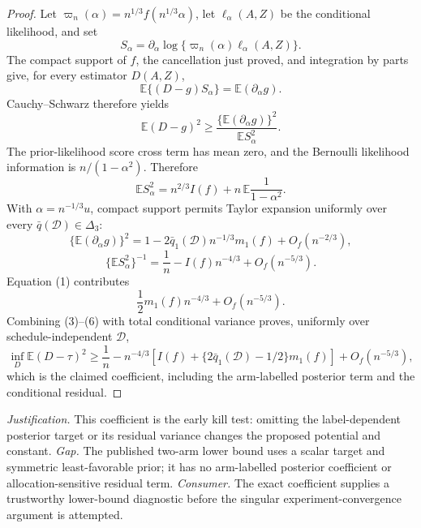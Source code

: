 \documentclass{article}
\begin{document}
\begin{proof}
Let \(\varpi_n(\alpha)=n^{1/3}f(n^{1/3}\alpha)\), let \(\ell_\alpha(A,Z)\) be the conditional likelihood, and set
\[
S_\alpha=\partial_\alpha\log\{\varpi_n(\alpha)\ell_\alpha(A,Z)\}.
\]
The compact support of \(f\), the cancellation just proved, and integration by parts give, for every estimator \(D(A,Z)\),
\[
\mathbb E\{(D-g)S_\alpha\}=\mathbb E(\partial_\alpha g).
\]
Cauchy--Schwarz therefore yields
\[
\mathbb E(D-g)^2\geq
\frac{\{\mathbb E(\partial_\alpha g)\}^2}{\mathbb E S_\alpha^2}.
\tag{3}
\]
The prior-likelihood score cross term has mean zero, and the Bernoulli likelihood information is \(n/(1-\alpha^2)\).  Therefore
\[
\mathbb E S_\alpha^2
=n^{2/3}I(f)+n\,\mathbb E\frac1{1-\alpha^2}.
\tag{4}
\]
With \(\alpha=n^{-1/3}u\), compact support permits Taylor expansion uniformly over every \(\bar q(\mathcal D)\in\Delta_3\):
\[
\{\mathbb E(\partial_\alpha g)\}^2
=1-2\bar q_1(\mathcal D)n^{-1/3}m_1(f)+O_f(n^{-2/3}),
\]
\[
\{\mathbb E S_\alpha^2\}^{-1}
=\frac1n-I(f)n^{-4/3}+O_f(n^{-5/3}).
\tag{5}
\]
Equation (1) contributes
\[
\frac12m_1(f)n^{-4/3}+O_f(n^{-5/3}).
\tag{6}
\]
Combining (3)--(6) with total conditional variance proves, uniformly over schedule-independent \(\mathcal D\),
\[
\inf_D\mathbb E(D-\tau)^2
\geq \frac1n-n^{-4/3}
\left[I(f)+\{2\bar q_1(\mathcal D)-1/2\}m_1(f)\right]
+O_f(n^{-5/3}),
\]
which is the claimed coefficient, including the arm-labelled posterior term and the conditional residual.
\end{proof}
\par\smallskip\noindent \textit{Justification.} This coefficient is the early kill test: omitting the label-dependent posterior target or its residual variance changes the proposed potential and constant. \textit{Gap.} The published two-arm lower bound uses a scalar target and symmetric least-favorable prior; it has no arm-labelled posterior coefficient or allocation-sensitive residual term. \textit{Consumer.} The exact coefficient supplies a trustworthy lower-bound diagnostic before the singular experiment-convergence argument is attempted.
\end{document}
